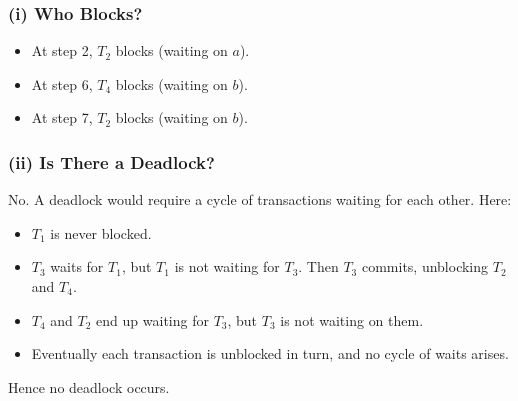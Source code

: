 \documentclass{article}
\begin{document}
\subsubsection*{(i) Who Blocks?}
\begin{itemize}
  \item At step 2, $T_2$ blocks (waiting on $a$).
  \item At step 6, $T_4$ blocks (waiting on $b$).
  \item At step 7, $T_2$ blocks (waiting on $b$).
\end{itemize}

\subsubsection*{(ii) Is There a Deadlock?}
No. A deadlock would require a cycle of transactions waiting for each other. Here:

\begin{itemize}
  \item $T_1$ is never blocked.
  \item $T_3$ waits for $T_1$, but $T_1$ is not waiting for $T_3$. Then $T_3$ commits, unblocking $T_2$ and $T_4$.
  \item $T_4$ and $T_2$ end up waiting for $T_3$, but $T_3$ is not waiting on them.
  \item Eventually each transaction is unblocked in turn, and no cycle of waits arises.
\end{itemize}

Hence no deadlock occurs.
\end{document}
